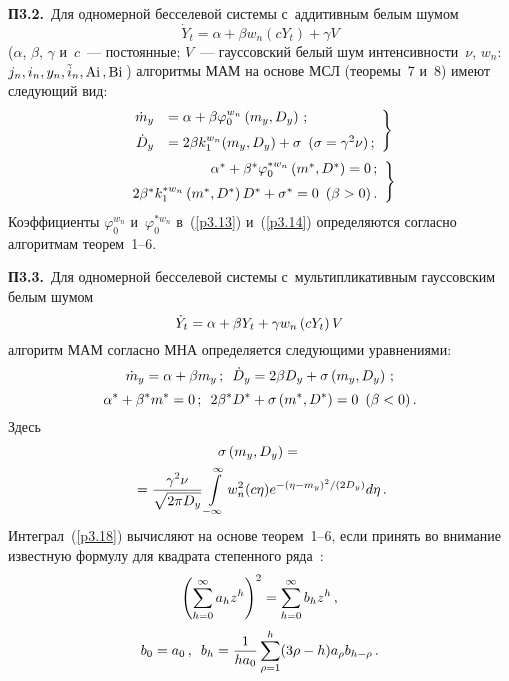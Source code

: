 \begin{multicols}{2}
{\noindent
\textbf{П3.2.}\ Для одномерной бесселевой системы с~аддитивным белым шумом
  $$
  \dot Y_t = \alpha +\beta w_n \left(cY_t\right) + \gamma V
  $$
($\alpha$, $\beta$, $\gamma$ и~$c$~--- постоянные; 
$V$~--- гауссовский белый шум интенсивности~$\nu$, 
$w_n$: $j_n, i_n, y_n, \tilde i_n, \mathrm{Ai}\,, \mathrm{Bi}\,$) алгоритмы МАМ на основе 
МСЛ (теоремы~7 и~8) имеют  следующий вид:
    \begin{equation}
    \left.
    \begin{array}{rl}
    \dot m_y &= \alpha + \beta \varphi_0^{w_n} \left(m_y, D_y\right)\,;\\[6pt] 
    \dot D_y &= 2\beta k_1^{w_n} (m_y, D_y) + \sigma \enskip ( \sigma = \gamma^2 \nu)\,;
    \end{array}
    \right\}
    \label{p3.13}
    \end{equation}
    \begin{equation}
    \left.
    \begin{array}{rl}
    \alpha^* + \beta^* \varphi_0^{*w_n}\left(m^*, D^*\right) =0\,; \\[6pt] 
    2 \beta^* k_1^{*w_n} \left(m^*, D^*\right) D^* + \sigma^*=0 \enskip (\beta>0)\,.
    \end{array}
    \right\}
    \label{p3.14}
    \end{equation}
Коэффициенты $\varphi_0^{w_n}$ и~$\varphi_0^{*w_n}$  в~(\ref{p3.13}) и~(\ref{p3.14}) 
определяются согласно алгоритмам теорем~1--6.


\textbf{П3.3.}\
Для одномерной бесселевой системы с~мультипликативным гауссовским белым шумом
    $$
    \dot Y_t = \alpha + \beta Y_t + \gamma w_n \left(cY_t\right) V
    $$
алгоритм МАМ  согласно МНА определяется следующими уравнениями:
    $$
    \dot m_y = \alpha + \beta m_y \,;\enskip 
    \dot D_y = 2\beta D_y + \sigma \left( m_y, D_y\right)\,;
    $$
    $$
    \alpha^* + \beta^* m^* =0\,;\enskip 
    2 \beta^* D^* + \sigma\left(m^*, D^*\right) =0 \enskip (\beta<0)\,.
    $$
Здесь
    \begin{multline}
    \sigma \left(m_y, D_y\right) ={}\\
    {}= \displaystyle\frac{\displaystyle \gamma^2 \nu\mathstrut}{\displaystyle \sqrt{2\pi D_y}\mathstrut} 
    \int\limits_{-\infty}^\infty w_n^2 (c\eta) e^{-(\eta-m_y)^2/(2D_y)} d\eta\,.
    \label{p3.18}
    \end{multline}
Интеграл~(\ref{p3.18}) вычисляют на основе теорем~1--6, 
если принять во внимание известную формулу для квадрата степенного ряда~\cite{3-sin}:
    $$
    \left( \sum\limits_{h=0}^\infty a_h z^h\right)^2 = 
    \sum\limits_{h=0}^\infty b_h z^h\,,
    $$
    $$
    b_0 = a_0\,,\enskip 
    b_h = \displaystyle\frac{\displaystyle 1\mathstrut}{\displaystyle ha_0\mathstrut} \sum\limits_{\rho=1}^h (3\rho - h) a_\rho b_{h-\rho}\,.
    $$
    
}
\end{multicols}
